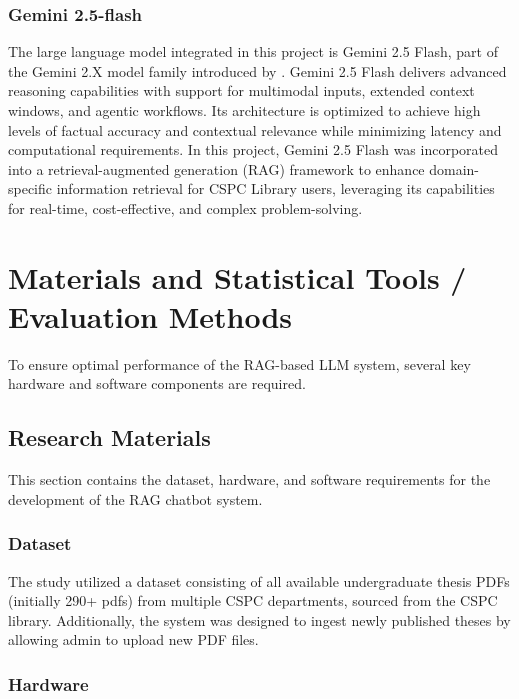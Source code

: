 \begin{refsection}
\subsubsection{Gemini 2.5-flash}

The large language model integrated in this project is Gemini 2.5 Flash, part of the Gemini 2.X model family introduced by \citeauthor{comanici2025gemini} \citeyear{comanici2025gemini}. Gemini 2.5 Flash delivers advanced reasoning capabilities with support for multimodal inputs, extended context windows, and agentic workflows. Its architecture is optimized to achieve high levels of factual accuracy and contextual relevance while minimizing latency and computational requirements. In this project, Gemini 2.5 Flash was incorporated into a retrieval-augmented generation (RAG) framework to enhance domain-specific information retrieval for CSPC Library users, leveraging its capabilities for real-time, cost-effective, and complex problem-solving.

\section{Materials and Statistical Tools / Evaluation Methods}

To ensure optimal performance of the RAG-based LLM system, several key hardware and software components are required.

\subsection{Research Materials}

This section contains the dataset, hardware, and software requirements for the development of the RAG chatbot system.

\subsubsection{Dataset}

The study utilized a dataset consisting of all available undergraduate thesis PDFs (initially 290+ pdfs) from multiple CSPC departments, sourced from the CSPC library. Additionally, the system was designed to ingest newly published theses by allowing admin to upload new PDF files.

\subsubsection{Hardware}


\end{refsection}
